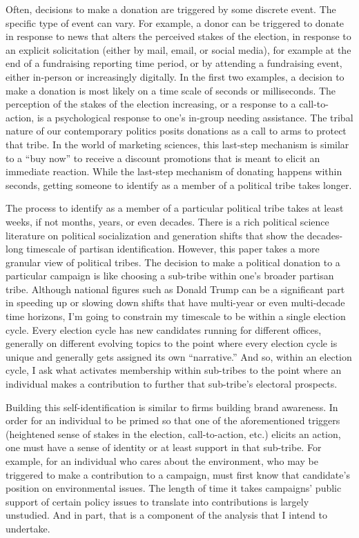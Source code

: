 \documentclass[12pt,]{article}
\begin{document}
Often, decisions to make a donation are triggered by some discrete
event. The specific type of event can vary. For example, a donor can be
triggered to donate in response to news that alters the perceived stakes
of the election, in response to an explicit solicitation (either by
mail, email, or social media), for example at the end of a fundraising
reporting time period, or by attending a fundraising event, either
in-person or increasingly digitally. In the first two examples, a
decision to make a donation is most likely on a time scale of seconds or
milliseconds. The perception of the stakes of the election increasing,
or a response to a call-to-action, is a psychological response to one's
in-group needing assistance. The tribal nature of our contemporary
politics posits donations as a call to arms to protect that tribe. In
the world of marketing sciences, this last-step mechanism is similar to
a ``buy now'' to receive a discount promotions that is meant to elicit
an immediate reaction. While the last-step mechanism of donating happens
within seconds, getting someone to identify as a member of a political
tribe takes longer.

The process to identify as a member of a particular political tribe
takes at least weeks, if not months, years, or even decades. There is a
rich political science literature on political socialization and
generation shifts that show the decades-long timescale of partisan
identification. However, this paper takes a more granular view of
political tribes. The decision to make a political donation to a
particular campaign is like choosing a sub-tribe within one's broader
partisan tribe. Although national figures such as Donald Trump can be a
significant part in speeding up or slowing down shifts that have
multi-year or even multi-decade time horizons, I'm going to constrain my
timescale to be within a single election cycle. Every election cycle has
new candidates running for different offices, generally on different
evolving topics to the point where every election cycle is unique and
generally gets assigned its own ``narrative.'' And so, within an
election cycle, I ask what activates membership within sub-tribes to the
point where an individual makes a contribution to further that
sub-tribe's electoral prospects.

Building this self-identification is similar to firms building brand
awareness. In order for an individual to be primed so that one of the
aforementioned triggers (heightened sense of stakes in the election,
call-to-action, etc.) elicits an action, one must have a sense of
identity or at least support in that sub-tribe. For example, for an
individual who cares about the environment, who may be triggered to make
a contribution to a campaign, must first know that candidate's position
on environmental issues. The length of time it takes campaigns' public
support of certain policy issues to translate into contributions is
largely unstudied. And in part, that is a component of the analysis that
I intend to undertake.
\end{document}
